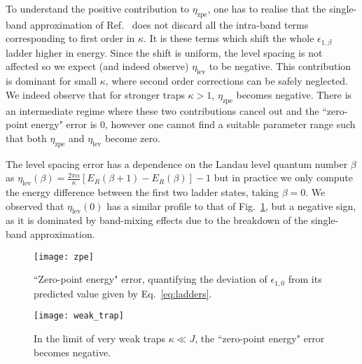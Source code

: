 \documentclass[twocolumn, 10pt, aps, superscriptaddress, floatfix, showpacs, prb, citeautoscript]{revtex4-1}
\newcommand{\co}[2]{#2}
\renewcommand{\paragraph}{\co}
\begin{document}
\paragraph{This contribution is due to intra-band terms.}
To understand the positive contribution to $\eta_{\text{zpe}}$, one
has to realise that the single-band approximation of
Ref.~ does not discard all the
intra-band terms corresponding to first order in $\kappa$. It is these
terms which shift the whole $\epsilon_{1,\beta}$ ladder higher in
energy. Since the shift is uniform, the level spacing is not affected
so we expect (and indeed observe) $\eta_{\text{lev}}$ to be
negative. This contribution is dominant for small $\kappa$, where
second order corrections can be safely neglected. We indeed observe
that for stronger traps $\kappa > 1$, $\eta_{\text{zpe}}$ becomes
negative. There is an intermediate regime where these two
contributions cancel out and the ``zero-point energy" error is 0,
however one cannot find a suitable parameter range such that both
$\eta_{\text{zpe}}$ and $\eta_{\text{lev}}$ become zero.


\paragraph{The level spacing error is dominated by band-mixing effects. }
The level spacing error has a dependence on the Landau level quantum
number $\beta$ as
$\eta_{\text{lev}}(\beta) = \frac{2\pi \alpha}{\kappa} [E_R(\beta+1) -
E_R(\beta)] -1$
but in practice we only compute the energy difference between the
first two ladder states, taking $\beta = 0$. We observed that
$\eta_{\text{lev}}(0)$ has a similar profile to that of
Fig.~\ref{fig:zpe}, but a negative sign, as it is dominated by
band-mixing effects due to the breakdown of the single-band
approximation.


\begin{figure}[htb]\centering
  \texttt{[image: zpe]}
  \caption{``Zero-point energy" error, quantifying the deviation of
    $\epsilon_{1,0}$ from its predicted value given by Eq.~\eqref{eq:ladders}.}
  \label{fig:zpe}
\end{figure}





\begin{figure}[htb]\centering
  \texttt{[image: weak\_trap]}
  \caption{In the limit of very weak traps $\kappa \ll J$, the
    ``zero-point energy" error becomes negative.}
  \label{fig:error_small_kappa}
\end{figure}
\end{document}

